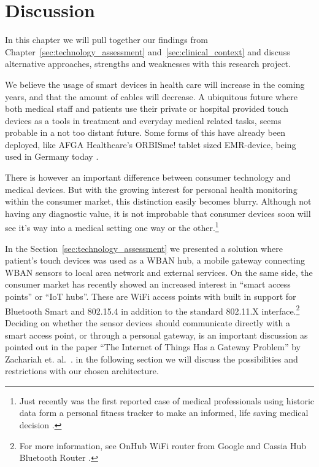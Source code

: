 \section{Discussion} %
\label{sec:discussion}

In this chapter we will pull together our findings from Chapter~\ref{sec:technology_assessment} and~\ref{sec:clinical_context} and discuss alternative approaches, strengths and weaknesses with this research project. 

We believe the usage of smart devices in health care will increase in the coming years, and that the amount of cables will decrease. A ubiquitous future where both medical staff and patients use their private or hospital provided touch devices as a tools in treatment and everyday medical related tasks, seems probable in a not too distant future. Some forms of this have already been deployed, like AFGA Healthcare's ORBISme! tablet sized EMR-device, being used in Germany today \cite{newRef:271}. 

There is however an important difference between consumer technology and medical devices. But with the growing interest for personal health monitoring within the consumer market, this distinction easily becomes blurry. Although not having any diagnostic value, it is not improbable that consumer devices soon will see it's way into a medical setting one way or the other.\footnote{ Just recently was the first reported case of medical professionals using historic data form a personal fitness tracker to make an informed, life saving medical decision \cite{newRef:29}.}

In the Section~\ref{sec:technology_assessment} we presented a solution where patient's touch devices was used as a WBAN hub, a mobile gateway connecting WBAN sensors to local area network and external services. On the same side, the consumer market has recently showed an increased interest in ``smart access points'' or ``IoT hubs''. These are WiFi access points with built in support for Bluetooth Smart and 802.15.4 in addition to the standard 802.11.X interface.\footnote{ For more information, see OnHub WiFi router from Google \cite{newRef:60} and Cassia Hub Bluetooth Router \cite{newRef:61}.} Deciding on whether the sensor devices should communicate directly with a smart access point, or through a personal gateway, is an important discussion as pointed out in the paper ``The Internet of Things Has a Gateway Problem'' by Zachariah et. al.~\cite{Zachariah:2015cm}. in the following section we will discuss the possibilities and restrictions with our chosen architecture.

